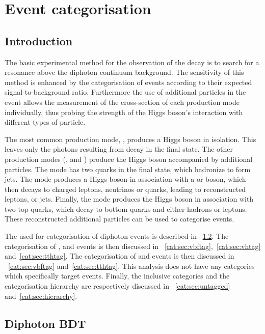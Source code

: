 \chapter{Event categorisation}
\label{chap:categorisation}

\section{Introduction}
\label{cat:sec:intro}

The basic experimental method for the observation of the \Hgg decay is to search for a resonance above the diphoton continuum background. The sensitivity of this method is enhanced by the categorisation of events according to their expected signal-to-background ratio. Furthermore the use of additional particles in the event allows the measurement of the cross-section of each production mode individually, thus probing the strength of the Higgs boson's interaction with different types of particle. %

The most common production mode, \ggH, produces a Higgs boson in isolation. This leaves only the photons resulting from \Hgg decay in the final state. The other production modes (\VBF, \VH and \ttH) produce the Higgs boson accompanied by additional particles. The \VBF mode has two quarks in the final state, which hadronize to form jets. The \VH mode produces a Higgs boson in association with a \PW or \PZ boson, which then decays to charged leptons, neutrinos or quarks, leading to reconstructed leptons, \MET or jets. Finally, the \ttH mode produces the Higgs boson in association with two top quarks, which decay to bottom quarks and either hadrons or leptons. These reconstructed additional particles can be used to categorise events. 

The \BDT used for categorisation of diphoton events is described in \Sec~\ref{cat:sec:dipho_bdt}. 
\ifNewAnalysis
The categorisation of \VBF, \VH and \ttH events is then discussed in \Sec\s~\ref{cat:sec:vbftag},~\ref{cat:sec:vhtag} and~\ref{cat:sec:tthtag}. 
\else
The categorisation of \VBF and \ttH events is then discussed in \Sec\s~\ref{cat:sec:vbftag} and~\ref{cat:sec:tthtag}. This analysis does not have any categories which specifically target \VH events.
\fi
Finally, the inclusive \Untagged categories and the categorisation hierarchy are respectively discussed in \Sec\s~\ref{cat:sec:untagged} and~\ref{cat:sec:hierarchy}.

\section{Diphoton BDT}
\label{cat:sec:dipho_bdt}


